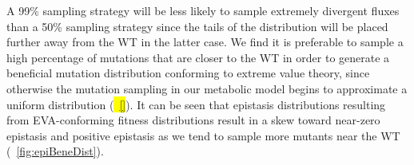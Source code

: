 A 99\% sampling strategy will be less likely to sample extremely
divergent fluxes than a 50\% sampling strategy since the tails of the
distribution will be placed further away from the WT in the latter
case. We find it is preferable to sample a high percentage of mutations
that are closer to the WT in order to generate a beneficial
mutation distribution conforming to extreme value theory, since otherwise
the mutation sampling in our metabolic model begins to approximate
a uniform distribution (\hl{\suppOrApp \Fig~\ref{}}).  It can be
seen that epistasis distributions resulting from EVA-conforming
fitness distributions result in a skew toward near-zero epistasis and
positive epistasis as we tend to sample more mutants near the WT
(\Fig~\ref{fig:epiBeneDist}).









